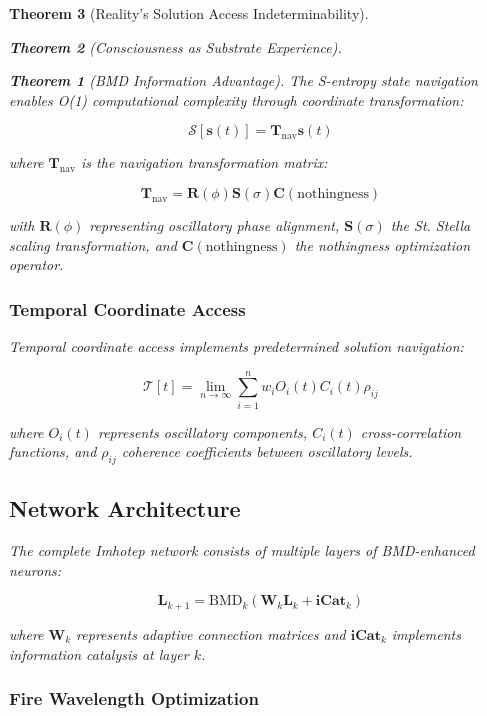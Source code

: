 \documentclass[12pt,a4paper]{article}
\newtheorem{theorem}{Theorem}[section]
\theoremstyle{remark}
\begin{document}
\begin{theorem}[Reality's Solution Access Indeterminability]
\begin{theorem}[Consciousness as Substrate Experience]
\begin{theorem}[BMD Information Advantage]
{{{The S-entropy state navigation enables O(1) computational complexity through coordinate transformation:

\begin{equation}
\mathcal{S}[\mathbf{s}(t)] = \mathbf{T}_{\text{nav}} \mathbf{s}(t)
\end{equation}

where $\mathbf{T}_{\text{nav}}$ is the navigation transformation matrix:

\begin{equation}
\mathbf{T}_{\text{nav}} = \mathbf{R}(\phi) \mathbf{S}(\sigma) \mathbf{C}(\text{nothingness})
\end{equation}

with $\mathbf{R}(\phi)$ representing oscillatory phase alignment, $\mathbf{S}(\sigma)$ the St. Stella scaling transformation, and $\mathbf{C}(\text{nothingness})$ the nothingness optimization operator.

\subsubsection{Temporal Coordinate Access}

Temporal coordinate access implements predetermined solution navigation:

\begin{equation}
\mathcal{T}[t] = \lim_{n \to \infty} \sum_{i=1}^{n} w_i O_i(t) C_i(t) \rho_{ij}
\end{equation}

where $O_i(t)$ represents oscillatory components, $C_i(t)$ cross-correlation functions, and $\rho_{ij}$ coherence coefficients between oscillatory levels.

\subsection{Network Architecture}

The complete Imhotep network consists of multiple layers of BMD-enhanced neurons:

\begin{equation}
\mathbf{L}_{k+1} = \text{BMD}_k\left(\mathbf{W}_k \mathbf{L}_k + \mathbf{iCat}_k\right)
\end{equation}

where $\mathbf{W}_k$ represents adaptive connection matrices and $\mathbf{iCat}_k$ implements information catalysis at layer $k$.

\subsubsection{Fire Wavelength Optimization}

}}}
\end{theorem}
\end{theorem}
\end{theorem}
\end{document}
